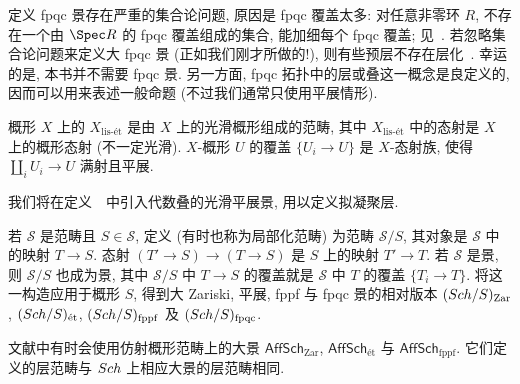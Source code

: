 \begin{caution}\label{src:3.2.10}
定义 fpqc 景存在严重的集合论问题, 原因是 fpqc 覆盖太多: 对任意非零环 $R$, 不存在一个由 $\Spec R$ 的 fpqc 覆盖组成的集合, 能加细每个 fpqc 覆盖; 见~\cite[Tags 0BBK, 03NV]{SP}. 若忽略集合论问题来定义大 fpqc 景 (正如我们刚才所做的!), 则有些预层不存在层化~\cite[定理 $5.5$]{Wat75}. 幸运的是, 本书并不需要 fpqc 景. 另一方面, fpqc 拓扑中的层或叠这一概念是良定义的, 因而可以用来表述一般命题 (不过我们通常只使用平展情形).
\end{caution}
\begin{example}[光滑平展景]\label{src:3.2.11}
概形 $X$ 上的 $X_{\text{lis-ét}}$ 是由 $X$ 上的光滑概形组成的范畴, 其中 $X_{\text{lis-ét}}$ 中的态射是 $X$ 上的概形态射 (不一定光滑). $X$-概形 $U$ 的覆盖 $\{U_i\to U\}$ 是 $X$-态射族, 使得 $\coprod_i U_i\to U$ 满射且平展.
\end{example}
我们将在定义~~中引入代数叠的光滑平展景, 用以定义拟凝聚层.
\begin{example}[限制范畴与限制景]\label{src:3.2.12}
若 $\mathcal S$ 是范畴且 $S\in\mathcal S$, 定义 (有时也称为局部化范畴) 为范畴 $\mathcal S/S$, 其对象是 $\mathcal S$ 中的映射 $T\to S$. 态射 $(T'\to S)\to(T\to S)$ 是 $S$ 上的映射 $T'\to T$. 若 $\mathcal S$ 是景, 则 $\mathcal S/S$ 也成为景, 其中 $\mathcal S/S$ 中 $T\to S$ 的覆盖就是 $\mathcal S$ 中 $T$ 的覆盖 $\{T_i\to T\}$. 将这一构造应用于概形 $S$, 得到大 Zariski, 平展, fppf 与 fpqc 景的相对版本 $(Sch/S)_{\mathrm{Zar}}$, $(Sch/S)_{\text{ét}}$, $(Sch/S)_{\mathrm{fppf}}$ 及 $(Sch/S)_{\mathrm{fpqc}}$.
\end{example}
\begin{example}\label{src:3.2.13}
文献中有时会使用仿射概形范畴上的大景 $\mathsf{AffSch}_{\mathrm{Zar}}$, $\mathsf{AffSch}_{\text{ét}}$ 与 $\mathsf{AffSch}_{\mathrm{fppf}}$. 它们定义的层范畴与 $Sch$ 上相应大景的层范畴相同.
\end{example}
